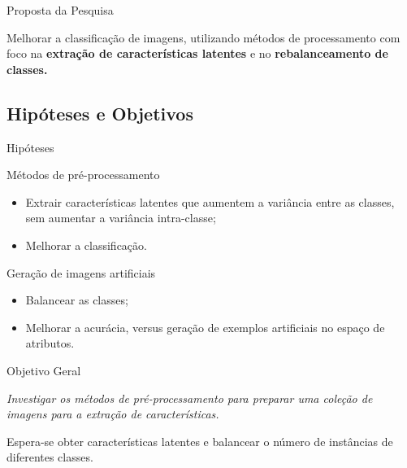 \documentclass{beamer}
\begin{document}
\begin{frame}{Proposta da Pesquisa}
\begin{block}{}
\justifying
    Melhorar a classificação de imagens, utilizando métodos de processamento com foco na \textbf{extração de características latentes} e no \textbf{rebalanceamento de classes.}
\end{block}
\end{frame}
\subsection{Hipóteses e Objetivos}
\setlength\leftmargini{1em}
\justifying
 \begin{frame}{Hipóteses}
  \begin{block}{Métodos de pré-processamento}
    \justifying
    \begin{itemize}
      \item Extrair características latentes que aumentem a variância entre as classes, sem aumentar a variância intra-classe;
      \item Melhorar a classificação.
    \end{itemize}
  \end{block}
  \begin{block}{Geração de imagens artificiais}
    \justifying
    \begin{itemize}
      \item Balancear as classes;
      \item Melhorar a acurácia, versus geração de exemplos artificiais no espaço de atributos.
    \end{itemize}
  \end{block}
\end{frame}
\begin{frame}{Objetivo Geral}
\setlength\leftmargini{1em}
\justifying
  \begin{block}{}
  \justifying
  \emph{Investigar os métodos de pré-processamento para preparar uma coleção de imagens para a extração de características.}

  \vspace{5mm}
  Espera-se obter características latentes e balancear o número de instâncias de diferentes classes.
  \end{block}
\end{frame}
\end{document}
